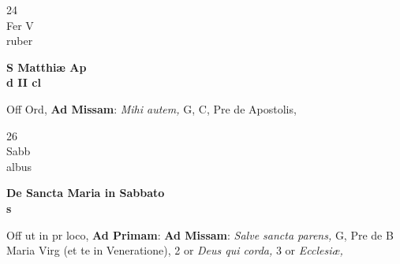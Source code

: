 \documentclass[10pt, openany]{book}
\begin{document}
        \begin{center}
            \begin{minipage}{3.5in}
                \vspace{2em}
                \begin{minipage}{0.5in}
                    {\Huge 24} \\
                    {\normalsize Fer V} \\
                    {\normalsize ruber}
                \end{minipage}
                \begin{minipage}{3.0in}
                    \textbf{ \large S Matthiæ Ap \\
                    \textnormal{\normalsize d II cl}} \\ 
                \end{minipage}
                \begin{justify}Off Ord, \textbf{Ad Missam}: \textit{Mihi autem,} G, C, Pre de Apostolis,  
                \end{justify}
            \end{minipage}
        \end{center}
    
        \begin{center}
            \begin{minipage}{3.5in}
                \vspace{2em}
                \begin{minipage}{0.5in}
                    {\Huge 26} \\
                    {\normalsize Sabb} \\
                    {\normalsize albus}
                \end{minipage}
                \begin{minipage}{3.0in}
                    \textbf{ \large De Sancta Maria in Sabbato \\
                    \textnormal{\normalsize s}} \\ 
                \end{minipage}
                \begin{justify}Off ut in pr loco, \textbf{Ad Primam}: \textbf{Ad Missam}: \textit{Salve sancta parens,} G, Pre de B Maria Virg (et te in Veneratione), 2 or \textit{Deus qui corda,} 3 or \textit{Ecclesiæ,}  
                \end{justify}
            \end{minipage}
        \end{center}
    
\end{document}
